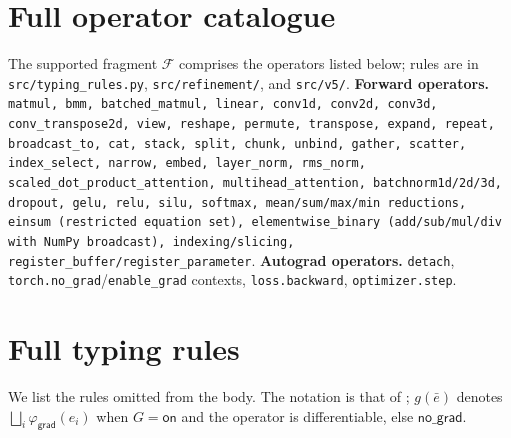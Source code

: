 \section{Full operator catalogue}\label{app:ops-extended}

The supported fragment $\mathcal F$ comprises the operators
listed below; rules are in \texttt{src/typing\_rules.py},
\texttt{src/refinement/}, and \texttt{src/v5/}.
\textbf{Forward operators.} \texttt{matmul, bmm, batched\_matmul,
linear, conv1d, conv2d, conv3d, conv\_transpose2d, view,
reshape, permute, transpose, expand, repeat, broadcast\_to,
cat, stack, split, chunk, unbind, gather, scatter,
index\_select, narrow, embed, layer\_norm, rms\_norm,
scaled\_dot\_product\_attention, multihead\_attention,
batchnorm1d/2d/3d, dropout, gelu, relu, silu, softmax,
mean/sum/max/min reductions, einsum (restricted equation set),
elementwise\_binary (add/sub/mul/div with NumPy broadcast),
indexing/slicing, register\_buffer/register\_parameter}.
\textbf{Autograd operators.} \texttt{detach},
\texttt{torch.no\_grad}/\texttt{enable\_grad} contexts,
\texttt{loss.backward}, \texttt{optimizer.step}.

\section{Full typing rules}\label{app:typing-rules}

We list the rules omitted from the body. The notation is that
of ; $g(\bar e)$ denotes
$\bigsqcup_i\varphi_{\mathsf{grad}}(e_i)$ when $G=\mathsf{on}$
and the operator is differentiable, else $\mathsf{no\_grad}$.

